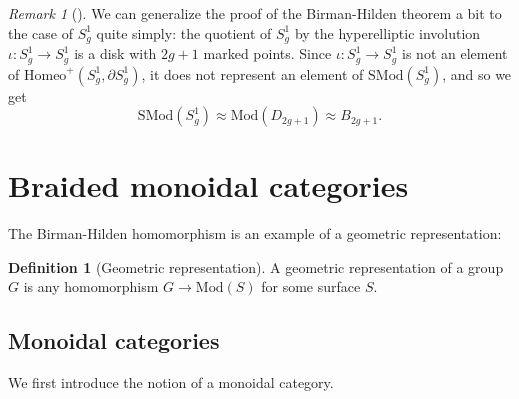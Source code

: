 \documentclass[reqno]{amsart}
\theoremstyle{definition}
\newtheorem{definition}[theorem]{Definition}
\theoremstyle{remark}
\newtheorem*{remark}{Remark}
\newcommand{\Mod}{{\mathrm{Mod}}}
\newcommand{\SMod}{{\mathrm{SMod}}}
\newcommand{\Homeo}{{\mathrm{Homeo}}}
\begin{document}
   \begin{remark}[]
       We can generalize the proof of the Birman-Hilden
       theorem a bit to the case of $S_g^{1}$ quite simply:
       the quotient of $S_g^{1}$ by the hyperelliptic
       involution $\iota \colon S_g^{1}\to 
       S_g^{1}$ is a disk with $2g+1$ marked points.
       Since  $\iota \colon S_g^{1} \to 
       S_g^{1}$ is not an element of
       $\Homeo^{+}\left( S_g^{1}, \partial
       S_g^{1}\right) $, it does not represent an
       element of $\SMod(S_g^{1})$, and so we 
       get 
       \[ \SMod \left( S_g^{1} \right) 
       \approx \Mod \left( D_{2g+1} \right) 
   \approx B_{2g+1}.\]
   \end{remark}




   \newpage


   \section{Braided monoidal categories}

   The Birman-Hilden homomorphism is an example of a geometric
   representation:

\begin{definition}[Geometric representation]
    A geometric representation of a group $G$ is any
    homomorphism $G \to \Mod (S)$ for some
    surface $S$.
\end{definition}


   \subsection{Monoidal categories}

   We first introduce the notion of a monoidal category.
\end{document}

